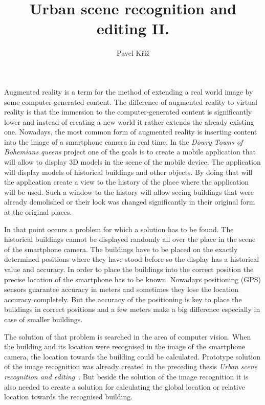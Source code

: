 \documentclass[thesis=B,english]{FITthesis}[2019/12/23]
\title{Urban scene recognition and editing II.}
\author{Pavel Kříž} %
\begin{document}

\begin{introduction}
    Augmented reality is a term for the method of extending a real world image by some computer-generated content. The difference of augmented reality to virtual reality is that the immersion to the computer-generated content is significantly lower and instead of creating a new world it rather extends the already existing one. Nowadays, the most common form of augmented reality is inserting content into the image of a smartphone camera in real time. In the \textit{Dowry Towns of Bohemians queens} project one of the goals is to create a mobile application that will allow to display 3D models in the scene of the mobile device. The application will display models of historical buildings and other objects. By doing that will the application create a view to the history of the place where the application will be used. Such a window to the history will allow seeing buildings that were already demolished or their look was changed significantly in their original form at the original places.
    
    In that point occurs a problem for which a solution has to be found. The historical buildings cannot be displayed randomly all over the place in the scene of the smartphone camera. The buildings have to be placed on the exactly determined positions where they have stood before so the display has a historical value and accuracy. In order to place the buildings into the correct position the precise location of the smartphone has to be known. Nowadays positioning (GPS) sensors guarantee accuracy in meters and sometimes they lose the location accuracy completely. But the accuracy of the positioning is key to place the buildings in correct positions and a few meters make a big difference especially in case of smaller buildings.
    
    The solution of that problem is searched in the area of computer vision. When the building and its location were recognised in the image of the smartphone camera, the location towards the building could be calculated. Prototype solution of the image recognition was already created in the preceding thesis \textit{Urban scene recognition and editing}~\cite{Sefcik2020}. But beside the solution of the image recognition it is also needed to create a solution for calculating the global location or relative location towards the recognised building.
\end{introduction}
\end{document}
